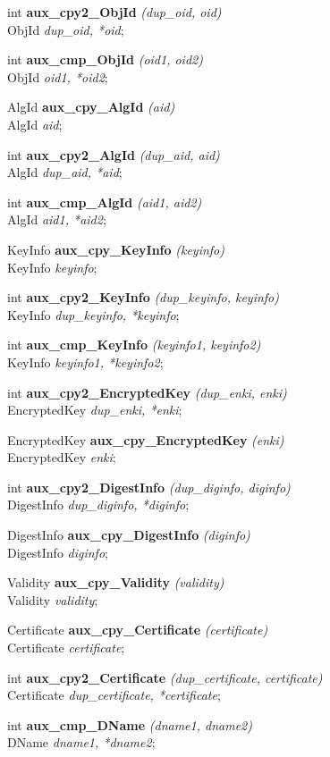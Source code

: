 int {\bf aux\_cpy2\_ObjId} {\em (dup\_oid, oid)} \\
ObjId {\em *dup\_oid, *oid};

int {\bf aux\_cmp\_ObjId} {\em (oid1, oid2)} \\
ObjId {\em *oid1, *oid2};

AlgId {\bf *aux\_cpy\_AlgId} {\em (aid)} \\
AlgId {\em *aid};

int {\bf aux\_cpy2\_AlgId} {\em (dup\_aid, aid)} \\
AlgId {\em *dup\_aid, *aid};

int {\bf aux\_cmp\_AlgId} {\em (aid1, aid2)} \\
AlgId {\em *aid1, *aid2};

KeyInfo {\bf *aux\_cpy\_KeyInfo} {\em (keyinfo)} \\
KeyInfo {\em *keyinfo};

int {\bf aux\_cpy2\_KeyInfo} {\em (dup\_keyinfo, keyinfo)} \\
KeyInfo {\em *dup\_keyinfo, *keyinfo};

int {\bf aux\_cmp\_KeyInfo} {\em (keyinfo1, keyinfo2)} \\
KeyInfo {\em *keyinfo1, *keyinfo2};

int {\bf aux\_cpy2\_EncryptedKey} {\em (dup\_enki, enki)} \\
EncryptedKey {\em *dup\_enki, *enki};

EncryptedKey {\bf *aux\_cpy\_EncryptedKey} {\em (enki)} \\
EncryptedKey {\em *enki};

int {\bf aux\_cpy2\_DigestInfo} {\em (dup\_diginfo, diginfo)} \\
DigestInfo {\em *dup\_diginfo, *diginfo};

DigestInfo {\bf *aux\_cpy\_DigestInfo} {\em (diginfo)} \\
DigestInfo {\em *diginfo};

Validity {\bf *aux\_cpy\_Validity} {\em (validity)} \\
Validity {\em *validity};

Certificate {\bf *aux\_cpy\_Certificate} {\em (certificate)} \\
Certificate {\em *certificate};

int {\bf aux\_cpy2\_Certificate} {\em (dup\_certificate, certificate)} \\
Certificate {\em *dup\_certificate, *certificate};

int {\bf aux\_cmp\_DName} {\em  (dname1, dname2)} \\
DName {\em *dname1, *dname2};

